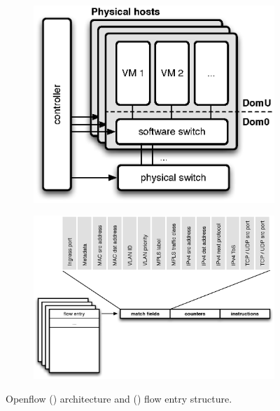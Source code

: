 \begin{figure}
    \centering
    \begin{subfigure}[b]{0.5\linewidth}
    \includegraphics[width=0.9\linewidth]{figures/inflex/ofparch}
    \caption{\label{fig:ofparch}}
    \end{subfigure}%
    \begin{subfigure}[b]{0.5\linewidth}
    \includegraphics[width=0.9\linewidth]{figures/inflex/ofptable}
    \caption{\label{fig:ofptable}}
    \end{subfigure}
    \caption[Openflow architecture and flow entry structure.]{Openflow () architecture and () flow entry structure.}
\end{figure}

